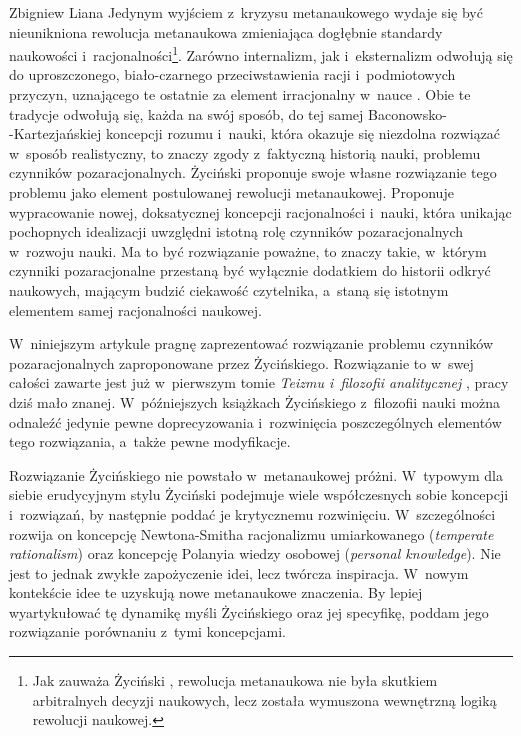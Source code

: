 \begin{artplenv}{Zbigniew Liana}
Jedynym wyjściem z~kryzysu metanaukowego wydaje się być nieunikniona rewolucja metanaukowa zmieniająca dogłębnie standardy naukowości i~racjonalności\footnote{Jak zauważa Życiński
\parencites*[][s.~202]{zycinski_structure_1988}[][s.~352]{zycinski_struktura_2013_liana}, %
 rewolucja metanaukowa nie była skutkiem arbitralnych decyzji naukowych, lecz została wymuszona wewnętrzną logiką rewolucji naukowej.}. Zarówno internalizm, jak i~eksternalizm odwołują się do uproszczonego, biało-czarnego przeciwstawienia racji i~podmiotowych przyczyn, uznającego te ostatnie za element irracjonalny w~nauce 
\parencite[][s.~227]{zycinski_teizm_1985}. %
 Obie te tradycje odwołują się, każda na swój sposób, do tej samej Baconowsko-\\-Kartezjańskiej koncepcji rozumu i~nauki, która okazuje się niezdolna rozwiązać w~sposób realistyczny, to znaczy zgody z~faktyczną historią nauki, problemu czynników pozaracjonalnych. Życiński proponuje swoje własne rozwiązanie tego problemu jako element postulowanej rewolucji metanaukowej. Proponuje wypracowanie nowej, doksatycznej koncepcji racjonalności i~nauki, która unikając pochopnych idealizacji uwzględni istotną rolę czynników pozaracjonalnych w~rozwoju nauki. Ma to być rozwiązanie poważne, to znaczy takie, w~którym czynniki pozaracjonalne przestaną być wyłącznie dodatkiem do historii odkryć naukowych, mającym budzić ciekawość czytelnika, a~staną się istotnym elementem samej racjonalności naukowej.%

W~niniejszym artykule pragnę zaprezentować rozwiązanie problemu czynników pozaracjonalnych zaproponowane przez Życińskiego. Rozwiązanie to w~swej całości zawarte jest już w~pierwszym tomie \textit{Teizmu i~filozofii analitycznej}
\parencite*[][]{zycinski_teizm_1985}, %
 pracy dziś mało znanej. W~późniejszych książkach Życińskiego z~filozofii nauki można odnaleźć jedynie pewne doprecyzowania i~rozwinięcia poszczególnych elementów tego rozwiązania, a~także pewne modyfikacje.

Rozwiązanie Życińskiego nie powstało w~metanaukowej próżni. W~typowym dla siebie erudycyjnym stylu Życiński podejmuje wiele współczesnych sobie koncepcji i~rozwiązań, by następnie poddać je krytycznemu rozwinięciu. W~szczególności rozwija on koncepcję Newtona-Smitha racjonalizmu umiarkowanego (\textit{temperate rationalism}) oraz koncepcję Polanyia wiedzy osobowej (\textit{personal knowledge}). Nie jest to jednak zwykłe zapożyczenie idei, lecz twórcza inspiracja. W~nowym kontekście idee te uzyskują nowe metanaukowe znaczenia. By lepiej wyartykułować tę dynamikę myśli Życińskiego oraz jej specyfikę, poddam jego rozwiązanie porównaniu z~tymi koncepcjami.


\end{artplenv}
